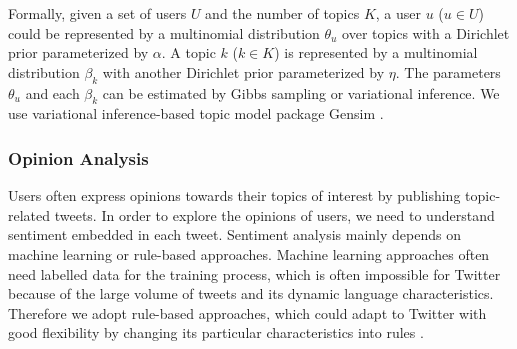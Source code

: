 \documentclass[twocolumn]{svjour3}          %
\begin{document}
Formally, given a set of users $ U $ and the number of topics $ K $, a user $u$ ($ u \in U $) could be represented by a multinomial distribution $ \theta_{u} $ over topics with a Dirichlet prior parameterized by $ \alpha $. 
A topic $ k $ ($ k \in K $) is represented by a multinomial distribution $ \beta_{k} $ with another Dirichlet prior parameterized by $ \eta $. 
The parameters $ \theta_{u} $ and each $ \beta_{k} $ can be estimated by Gibbs sampling or variational inference.
We use variational inference-based topic model package Gensim \cite{rehurek_lrec}.

\subsubsection{Opinion Analysis}
\label{sentiment}

Users often express opinions towards their topics of interest by publishing topic-related tweets. 
In order to explore the opinions of users, we need to understand sentiment embedded in each tweet.
Sentiment analysis mainly depends on machine learning or rule-based approaches. 
Machine learning approaches often need labelled data for the training process, which is often impossible for Twitter because of the large volume of tweets and its dynamic language characteristics. Therefore we adopt rule-based approaches, which could adapt to Twitter with good flexibility by changing its particular characteristics into rules \cite{Thelwall:2010SSS,Hu:2013www}.
\end{document}
